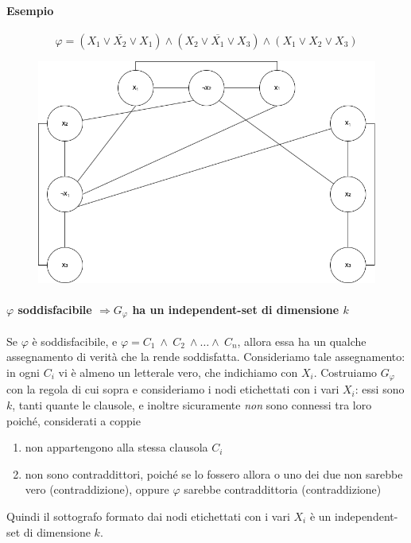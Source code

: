 \newpage

\paragraph{Esempio}
\begin{equation*}
    \varphi = (X_1 \lor \overline{X_2} \lor X_1) \land (X_2 \lor \overline{X_1} \lor X_3) \land (X_1 \lor X_2 \lor X_3)
\end{equation*}

\begin{figure}[H]
  \centering
  \includegraphics[scale=0.35]{IndSet}
\end{figure}

\paragraph{$\varphi$ soddisfacibile $\Rightarrow G_{\varphi}$ ha un independent-set di dimensione $k$}
Se $\varphi$ è soddisfacibile, e  $\varphi = C_1 \ \land \ C_2 \ \land \dots \land \ C_n$, allora essa ha un qualche assegnamento di verità che la rende soddisfatta. Consideriamo tale assegnamento: in ogni $C_i$ vi è almeno un letterale vero, che indichiamo con $X_i$. Costruiamo $G_{\varphi}$ con la regola di cui sopra e consideriamo i nodi etichettati con i vari $X_i$: essi sono $k$, tanti quante le clausole, e inoltre sicuramente \textit{non} sono connessi tra loro poiché, considerati a coppie
\begin{enumerate}
	\item non appartengono alla stessa clausola $C_i$

	\item non sono contraddittori, poiché se lo fossero allora o uno dei due non sarebbe vero (contraddizione), oppure $\varphi$ sarebbe contraddittoria (contraddizione)
\end{enumerate}
Quindi il sottografo formato dai nodi etichettati con i vari $X_i$ è un independent-set di dimensione $k$.

